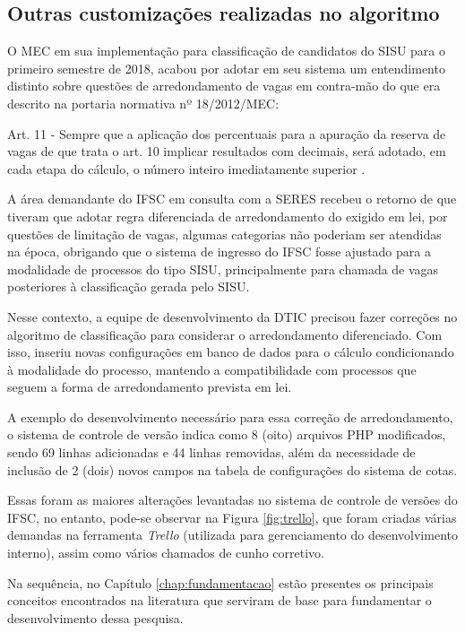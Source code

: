 \subsection{Outras customizações realizadas no algoritmo}
\label{outrasVersoes}

O \gls{MEC} em sua implementação para classificação de candidatos do \gls{SISU} para o primeiro semestre de 2018, acabou por adotar em seu sistema um entendimento distinto sobre questões de arredondamento de vagas em contra-mão do que era descrito na portaria normativa nº 18/2012/MEC:

\begin{citacao}
Art. 11 - Sempre que a aplicação dos percentuais para a apuração da reserva de vagas de que trata o art. 10 implicar resultados com decimais, será adotado, em cada etapa do cálculo, o número inteiro imediatamente superior \cite{portarianr9}.
\end{citacao}

%

\newpage
A área demandante do \gls{IFSC} em consulta com a \gls{SERES} recebeu o retorno de que tiveram que adotar regra diferenciada de arredondamento do exigido em lei, por questões de limitação de vagas, algumas categorias não poderiam ser atendidas na época, obrigando que o sistema de ingresso do \gls{IFSC} fosse ajustado para a modalidade de processos do tipo \gls{SISU}, principalmente para chamada de vagas posteriores à classificação gerada pelo \gls{SISU}.

Nesse contexto, a equipe de desenvolvimento da \gls{DTIC} precisou fazer correções no algoritmo de classificação para considerar o arredondamento diferenciado. Com isso, inseriu novas configurações em banco de dados para o cálculo condicionando à modalidade do processo, mantendo a compatibilidade com processos que seguem a forma de arredondamento prevista em lei.

A exemplo do desenvolvimento necessário para essa correção de arredondamento, o sistema de controle de versão indica como 8 (oito) arquivos PHP modificados, sendo 69 linhas adicionadas e 44 linhas removidas, além da necessidade de inclusão de 2 (dois) novos campos na tabela de configurações do sistema de cotas.

%


Essas foram as maiores alterações levantadas no sistema de controle de versões do \gls{IFSC}, no entanto, pode-se observar na Figura \ref{fig:trello}, que foram criadas várias demandas na ferramenta \textit{Trello} (utilizada para gerenciamento do desenvolvimento interno), assim como vários chamados de cunho corretivo.  

%



\newpage
Na sequência, no Capítulo \ref{chap:fundamentacao} estão presentes os principais conceitos encontrados na literatura que serviram de base para fundamentar o desenvolvimento dessa pesquisa.






